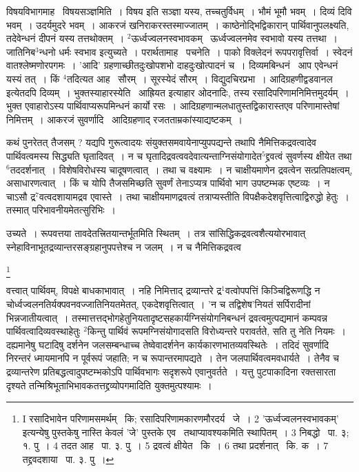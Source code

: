 \documentclass[11pt, openany]{book}
\newcommand\blfootnote[1]{%
 \begingroup
 \renewcommand\thefootnote{}\footnote{#1}%
 \addtocounter{footnote}{-1}%
 \endgroup
}
\begin{document}
विषयविभागमाह \textendash\ {\knu विषयसञ्ज्ञ}मिति~। विषय इति सञ्ज्ञा यस्य, तच्चतुर्विधम्~। भौमं भूमौ भवम्~। दिव्यं दिवि भवम्~। उदर्यमुदरे भवम्~। आकरजं खनिराकरस्तस्माज्जातम्~। काष्ठेनोद्भिद्विकारान् पार्थिवानुपलक्ष्यति, तदेवेन्धनं दीपनं यस्य तत्तथोक्तम्~। ${}^2${\knu ऊर्ध्वज्वलनस्वभावकम्} \textendash\ ऊर्ध्वज्वलनमेव स्वभावो यस्य तत्तथा~। जातिनिब$^3$न्धनो धर्मः स्वभाव इत्युच्यते~। परार्थतामाह \textendash\ {\knu पचनेति}~। पाको विक्लेदनं रूपपरावृत्तिर्वा~। स्वेदनं वातश्लेष्मणोरपगमः~। 'आदि' ग्रहणाच्छीतदुःखोपशभो दाहदुःखोत्पादनं च~। {\knu दिव्यमबिन्धनं} \textendash\ आप एवेन्धनं यस्यं तत्~। किं ${}^4$तदित्यत आह \textendash\ सौरम्~। सूरस्येदं सौरम्~। विद्युदचिरप्रभा~। आदिग्रहणीद्वडवानल इत्येतदपि दिव्यम्~। {\knu भुक्तस्याहारस्येति} \textendash\ आह्रियत इत्याहार ओदनादिः, तस्य रसादिपरिणामनिमित्तमुदर्यम्~। भुक्त एवाहारोऽस्य पार्थिवाप्यरूपमिन्धनं कार्यो रसः~। आदिग्रहणान्मलधातुस्तद्विकारास्तएव परिणामास्तेषां निमित्तम्~। {\knu आकरजं सुवर्णादि} \textendash\ आदिग्रहणाद् रजतताम्रकांस्याद्यष्टकम्~।

\begin{sloppypar}
कथं पुनरेतत् तैजसम् ? यद्यपि गुरूत्वादयः संयुक्तसमवायेनाप्युपपद्यन्ते तथापि नैमित्तिकद्रवत्वादेव पार्थिवत्वमस्य सिद्ध्यति घृतादिवत्~। न च घृतादिद्रवत्ववदेवात्यन्ताग्निसंयोगादेत$^5$द्द्रवत्वं सुवर्णस्य क्षीयेत तथा ${}^6$तददर्शनात्~। विशेषविरोधस्य चादूषणत्वात्~। तथा च वक्ष्यामः~। न चाक्षीयमाणेन द्रवत्वेन सत्प्रतिपक्षत्वम्, असाधारणत्वात्~। किं च योपि तैजसमिच्छति सुवर्णं तेनाऽप्यत्र पार्थिवो भाग उपष्टम्भक एष्टव्यः~। न चाऽसौ द्र$^7$वत्वदशायामद्रव एवास्ते~। तथा चाक्षीयमाणद्रवत्वं तत्राप्यस्तीति विपक्षैकदेशवृत्तित्वाद्विरुद्धो हेतुः~। तस्मात् परिभावनीयमेतत्सुरिभिः~।
\end{sloppypar}

उच्यते~। रूपवत्तया तावदेतत्त्रितयान्तर्भूतमिति स्थितम्~। तत्र सांसिद्धिकद्रवत्वशैत्ययोरभावात् स्नेहाविनाभूतद्रव्यान्तरसङ्ग्रहानुपपत्तेश्च न जलम्~। न च नैमित्तिकद्रवत्व\textendash

\blfootnote{I रसादिभावेन परिणामसमर्थम् \textendash\ कि; रसादिपरिणामकारणमौरदर्य \textendash\ जे~। 2 'ऊर्ध्वज्वलनस्वभावकम्' इत्यन्येषु पुस्तकेषु नास्ति केवलं 'जे' पुस्तके एव \textendash\ तथाप्यावश्यकमिति स्थापितम्~। 3 निबद्धो \textendash\ पा. ३; १. पु~। 4 तदत आह \textendash\ पा. ३. पु~। 5 द्रवत्वं क्षीयेत \textendash\ कि~। 6 तथा प्रदर्शनात् \textendash\ कि. क~। 7 तद्द्रवदशाया \textendash\ पा. ३. पु~।}

\newpage
\noindent
वत्त्वात् पार्थिवम्, विपक्षे बाधकाभावात्~। नहि निमित्ताद् द्रव्यान्तरे द्र$^1$वत्वोपपत्तिं किञ्चिद्विरूणद्धि न चोर्ध्वज्वलनतिर्यक्पवनवज्जातिनियतमेतत्, एकदेशवृत्तित्वात्~। 'न च तद्विशेष'नियतं सर्पिरादीनां भिन्नजातीयत्वात्~। तस्मात्तत्तद्भोगहेतुनियतादृष्टसहकार्यग्निसंयोगनिबन्धनं द्रवत्वमुत्पद्यमानं कम्पवन्न पार्थिवत्वादिव्यवस्थाहेतुः ${}^2$किन्तु पार्थिवं रूपमग्निसंयोगादसति विरोध्यन्तरे परावर्तते, सति तु नेति नियमः~। दह्यमानेषु घटादिषु दर्शनेन जलसम्बन्धाच्च तेष्वेवादर्शनेन कार्यकारणभातव्यवस्थितेः~। तदिदं सुवर्णादि निरन्तरं ध्मायमानपि न पूर्वरूपं जहाति; न च रूपान्तरमापद्यते~। तेन जलपार्थिवत्वमवधार्यते~। तेनैव च द्रव्यान्तरेण प्रतिबद्धत्वादुपष्टम्भकोऽपि पार्थिवभागः सदृशरूपे एवानुवर्तते~। यत्तु पुटपाकादिना रक्तसारता दृश्यते तन्मिश्रिभूताभिभावकतत्तद्द्रव्योपगमादिति युक्तमुत्पश्यामः~।
\end{document}
